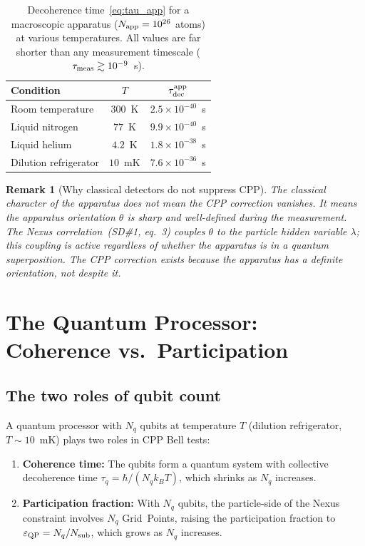 \documentclass[11pt,letterpaper]{article}
\newtheorem{remark}[theorem]{Remark}
\newcommand{\eps}{\varepsilon}
\begin{document}
\begin{table}[H]
\centering
\caption{Decoherence time~\eqref{eq:tau_app} for a macroscopic
  apparatus ($N_{\rm app} = 10^{26}$ atoms) at various temperatures.
  All values are far shorter than any measurement timescale
  ($\tau_{\rm meas} \gtrsim 10^{-9}$~s).}
\label{tab:tau_app}
\begin{tabular}{@{}lcc@{}}
\toprule
Condition & $T$ & $\tau_{\rm dec}^{\rm app}$ \\
\midrule
Room temperature & $300$~K & $2.5\times10^{-40}$~s \\
Liquid nitrogen & $77$~K & $9.9\times10^{-40}$~s \\
Liquid helium & $4.2$~K & $1.8\times10^{-38}$~s \\
Dilution refrigerator & $10$~mK & $7.6\times10^{-36}$~s \\
\bottomrule
\end{tabular}
\end{table}

\begin{remark}[Why classical detectors do not suppress CPP]
The classical character of the apparatus does \emph{not} mean the
CPP correction vanishes.  It means the apparatus orientation $\theta$
is sharp and well-defined during the measurement.  The Nexus
correlation~(SD\#1, eq.~3) couples $\theta$ to the particle hidden
variable $\lambda$; this coupling is active regardless of whether
the apparatus is in a quantum superposition.  The CPP correction
exists \emph{because} the apparatus has a definite orientation,
not despite it.
\end{remark}

\section{The Quantum Processor: Coherence vs.\ Participation}
\label{sec:QP}

\subsection{The two roles of qubit count}

A quantum processor with $N_q$ qubits at temperature $T$ (dilution
refrigerator, $T \sim 10$~mK) plays two roles in CPP Bell tests:

\begin{enumerate}
\item \textbf{Coherence time:} The qubits form a quantum system with
  collective decoherence time $\tau_q = \hbar/(N_q k_B T)$, which
  shrinks as $N_q$ increases.
\item \textbf{Participation fraction:} With $N_q$ qubits, the
  particle-side of the Nexus constraint involves $N_q$ Grid~Points,
  raising the participation fraction to $\eps_{\rm QP} = N_q /
  N_{\rm sub}$, which grows as $N_q$ increases.
\end{enumerate}
\end{document}
